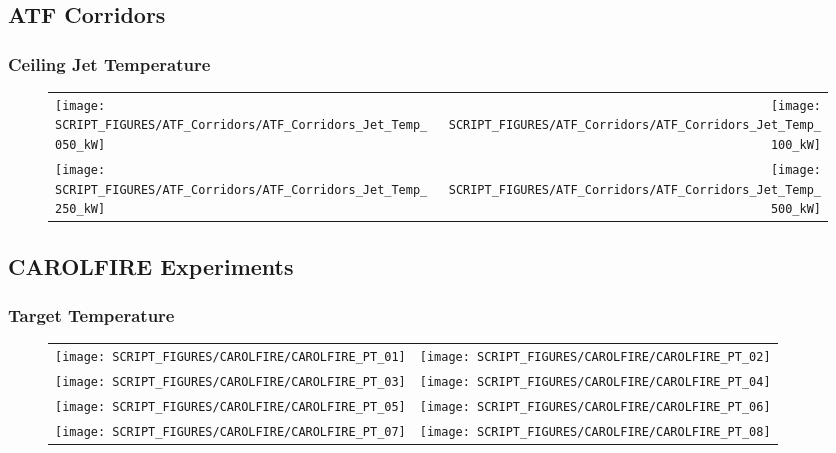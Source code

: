 

\subsection{ATF Corridors}

\subsubsection{Ceiling Jet Temperature}

\begin{figure}[!ht]
\begin{tabular*}{\textwidth}{l@{\extracolsep{\fill}}r}
\texttt{[image: SCRIPT\_FIGURES/ATF\_Corridors/ATF\_Corridors\_Jet\_Temp\_050\_kW]} &
\texttt{[image: SCRIPT\_FIGURES/ATF\_Corridors/ATF\_Corridors\_Jet\_Temp\_100\_kW]} \\
\texttt{[image: SCRIPT\_FIGURES/ATF\_Corridors/ATF\_Corridors\_Jet\_Temp\_250\_kW]} &
\texttt{[image: SCRIPT\_FIGURES/ATF\_Corridors/ATF\_Corridors\_Jet\_Temp\_500\_kW]}
\end{tabular*}
\end{figure}

\clearpage

\subsection{CAROLFIRE Experiments}

\subsubsection{Target Temperature}

\begin{figure}[!ht]
\begin{tabular*}{\textwidth}{l@{\extracolsep{\fill}}r}
\texttt{[image: SCRIPT\_FIGURES/CAROLFIRE/CAROLFIRE\_PT\_01]} &
\texttt{[image: SCRIPT\_FIGURES/CAROLFIRE/CAROLFIRE\_PT\_02]} \\
\texttt{[image: SCRIPT\_FIGURES/CAROLFIRE/CAROLFIRE\_PT\_03]} &
\texttt{[image: SCRIPT\_FIGURES/CAROLFIRE/CAROLFIRE\_PT\_04]} \\
\texttt{[image: SCRIPT\_FIGURES/CAROLFIRE/CAROLFIRE\_PT\_05]} &
\texttt{[image: SCRIPT\_FIGURES/CAROLFIRE/CAROLFIRE\_PT\_06]} \\
\texttt{[image: SCRIPT\_FIGURES/CAROLFIRE/CAROLFIRE\_PT\_07]} &
\texttt{[image: SCRIPT\_FIGURES/CAROLFIRE/CAROLFIRE\_PT\_08]}
\end{tabular*}
\end{figure}

